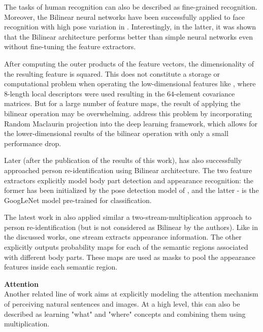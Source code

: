 The tasks of human recognition can also be described as fine-grained recognition. Moreover, the Bilinear neural networks have been successfully applied to face recognition with high pose variation in  \citep{lin2015bilinear}. Interestingly, in the latter, it was shown that the Bilinear architecture performs better than simple neural networks even without fine-tuning the feature extractors.  %

After computing the outer products of the feature vectors, the dimensionality of the resulting feature is squared. This does not constitute a storage or computational problem when operating the low-dimensional features like \citep{tuzel2008pedestrian}, where $8$-length local descriptors were used resulting in the $64$-element covariance matrices. %
But for a large number of feature maps, the result of applying the bilinear operation  may be overwhelming. \citep{gao2016compact} address this problem by incorporating Random Maclaurin projection into the deep learning framework, which allows for the lower-dimensional results of the bilinear operation  with only a small performance drop.

Later (after the publication of the results of this work), \citep{suh2018part} has  also successfully approached person re-identification using Bilinear architecture. The two feature extractors explicitly model body part detection and appearance recognition: the former has been initialized by the pose detection model of \citep{cao2017realtime}, and the latter - is the GoogLeNet model \citep{szegedy2015going} pre-trained for classification.

The latest work in \citep{kalayeh2018human} also applied similar a two-stream-multiplication approach to person re-identification (but is not considered as Bilinear by the authors). Like in the discussed works, one stream extracts appearance information. The other explicitly outputs probability maps for each of the semantic regions associated with different body parts. These maps are used as masks to pool the appearance features inside each semantic region.



\bigskip
\ident\textbf{Attention}\\
Another related line of work aims at explicitly modeling the attention mechanism of perceiving natural sentences and images. At a high level, this can also be described as learning "what" and "where" concepts and combining them using multiplication.

